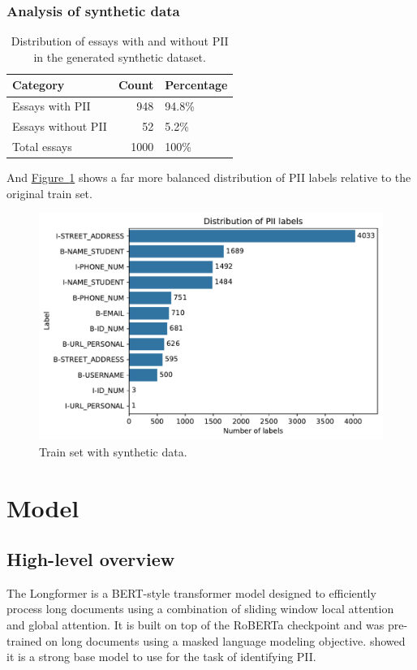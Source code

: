 \documentclass[11pt]{article}
\newcommand{\Figlink}[1]{\hyperref[#1]{Figure~\ref*{#1}}}
\begin{document}
\subsubsection{Analysis of synthetic data}

\begin{table}[h!]
  \centering
  \caption{
    Distribution of essays with and without PII in the generated synthetic dataset.}
  \label{tab:pii_distribution_synth}
  \begin{tabular}{lrl}
  \toprule
            Category &  Count & Percentage \\
  \midrule
     Essays with PII &    948 &      94.8\% \\
  Essays without PII &     52 &       5.2\% \\
        Total essays &   1000 &       100\% \\
  \bottomrule
  \end{tabular}
\end{table}

And \Figlink{fig:label_distribution_synth} shows a far more balanced distribution of PII labels relative to the original train set.

\begin{figure}[h!]
  \centering
  \includegraphics[width=\columnwidth]{images/label_distribution_synth.pdf}
  \caption{Train set with synthetic data.}
  \label{fig:label_distribution_synth}
\end{figure}

\section{Model}

\subsection{High-level overview}
The Longformer \cite{abs-2004-05150} is a BERT-style transformer model designed to efficiently process long documents using a combination of sliding window local attention and global attention. It is built on top of the RoBERTa checkpoint and was pre-trained on long documents using a masked language modeling objective. \citealt{pilan-etal-2022-text} showed it is a strong base model to use for the task of identifying PII.
\end{document}
